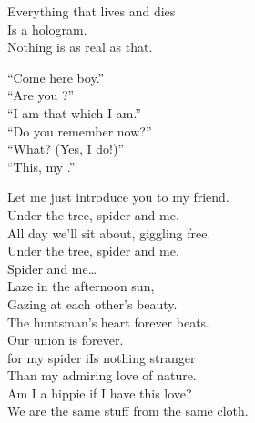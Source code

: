 
Everything that lives and dies \\
Is a hologram. \\
Nothing is as real as that. \\


``Come here boy.'' \\
``Are you ?'' \\
``I am that which I am.'' \\

``Do you remember now?'' \\
``What? (Yes, I do!)'' \\
``This, my .'' \\









Let me just introduce you to my friend. \\
Under the tree, spider and me. \\
All day we'll sit about, giggling free. \\
Under the tree, spider and me. \\

Spider and me… \\

Laze in the afternoon sun, \\
Gazing at each other's beauty. \\
The huntsman's heart forever beats. \\
Our union is forever. \\

 for my spider iIs nothing stranger \\
Than my admiring love of nature. \\
Am I a hippie if I have this love? \\
We are the same stuff from the same cloth. \\

